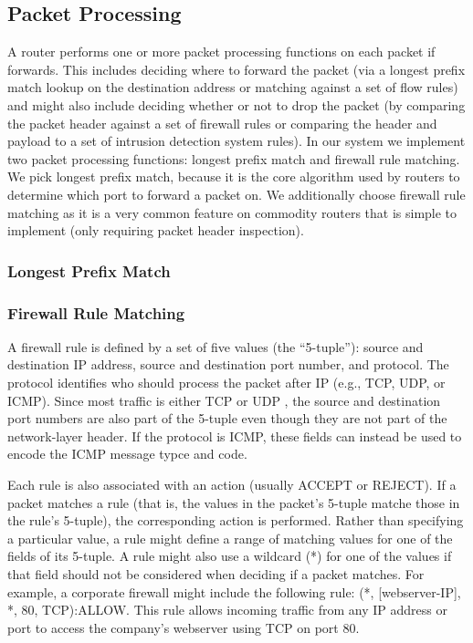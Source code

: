 \subsection{Packet Processing}

A router performs one or more packet processing functions on each packet if
forwards. This includes deciding where to forward the packet (via a longest
prefix match lookup on the destination address or matching against a set of
flow rules) and might also include deciding whether or not to drop the packet
(by comparing the packet header against a set of firewall rules or comparing
the header and payload to a set of intrusion detection system rules).  In our
system we implement two packet processing functions: longest prefix match and
firewall rule matching. We pick longest prefix match, because it is the core 
algorithm used by routers to determine which port to forward a packet on. We
additionally choose firewall rule matching as it is a very common feature on
commodity routers that is simple to implement (only requiring packet header
inspection).

\subsubsection{Longest Prefix Match}

\subsubsection{Firewall Rule Matching}

A firewall rule is defined by a set of five values (the ``5-tuple''): source
and destination IP address, source and destination port number, and protocol.
The protocol identifies who should process the packet after IP (e.g., TCP, UDP,
or ICMP). Since most traffic is either TCP or UDP \cite{thompson1997wide}, the source and
destination port numbers are also part of the 5-tuple even though they are not
part of the network-layer header. If the protocol is ICMP, these fields can
instead be used to encode the ICMP message typce and code.

Each rule is also associated with an action (usually ACCEPT or REJECT). If a
packet matches a rule (that is, the values in the packet's 5-tuple matche those
in the rule's 5-tuple), the corresponding action is performed. Rather than
specifying a particular value, a rule might define a range of matching values
for one of the fields of its 5-tuple. A rule might also use a wildcard (*) for
one of the values if that field should not be considered when deciding if a
packet matches. For example, a corporate firewall might include the following
rule: (*, [webserver-IP], *, 80, TCP):ALLOW. This rule allows incoming traffic
from any IP address or port to access the company's webserver using TCP on port
80.

